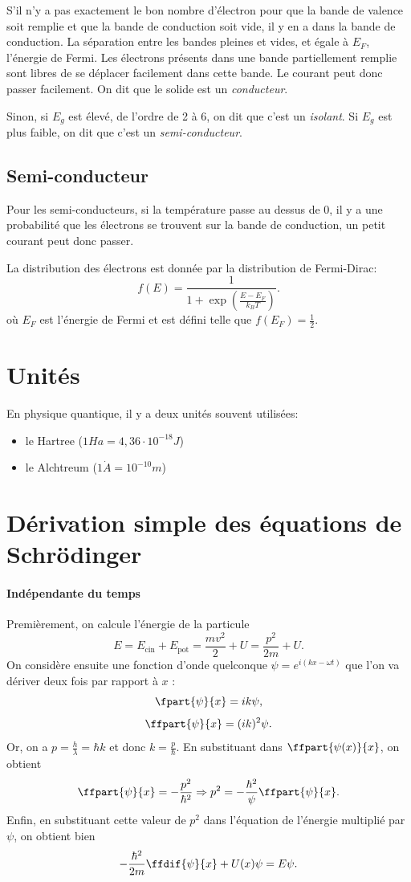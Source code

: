 S'il n'y a pas exactement le bon nombre d'électron pour
que la bande de valence soit remplie et que la bande de conduction soit
vide, il y en a dans la bande de conduction.
La séparation entre les bandes pleines et vides, et égale à $E_F$,
l'énergie de Fermi.
Les électrons présents dans une bande partiellement remplie sont libres de se
déplacer facilement dans cette bande. Le courant peut donc passer facilement.
On dit que le solide est un \emph{conducteur}.

Sinon, si $E_g$ est élevé, de l'ordre de 2 à \si{6}{\electronvolt},
on dit que c'est un \emph{isolant}.
Si $E_g$ est plus faible, on dit que c'est un \emph{semi-conducteur}.

\subsection{Semi-conducteur}
Pour les semi-conducteurs,
si la température passe au dessus de \si{0}{\kelvin},
il y a une probabilité que les électrons
se trouvent sur la bande de conduction,
un petit courant peut donc passer.

La distribution des électrons est donnée par la distribution de Fermi-Dirac:
\[ f(E) = \frac{1}{1+\exp\left(\frac{E-E_F}{k_BT}\right)}. \]
où $E_F$ est l'énergie de Fermi et est défini telle que
$f(E_F) = \frac{1}{2}$.

\appendix
\section{Unités}
En physique quantique, il y a deux unités souvent utilisées:
\begin{itemize}
\item le Hartree ($1Ha =  4,36\cdot 10^{-18} J$)
\item le Alchtreum ($1 \dot{A} = 10^{-10} m$)
\end{itemize}

\section{Dérivation simple des équations de Schrödinger}
\label{sec:deriv-eq}
\paragraph{Indépendante du temps}
Premièrement, on calcule l'énergie de la particule
\[ E = E_{\text{cin}} + E_{\text{pot}} = \frac{mv^2}{2} + U = \frac{p^2}{2m} + U.\]
On considère ensuite une fonction d'onde quelconque $\psi = e^{i(kx-\omega t)}$
que l'on va dériver deux fois par rapport à $x$ :
\[ \fpart{\psi}{x} = ik\psi ,\]
\[ \ffpart{\psi}{x} = (ik)^2\psi. \]
Or, on a $p = \frac{h}{\lambda} = \hbar k$ et donc $k = \frac{p}{\hbar}$.
En substituant dans $\ffpart{\psi(x)}{x}$, on obtient
\[ \ffpart{\psi}{x} = -\frac{p^2}{\hbar^2} \Rightarrow p^2 = 
-\frac{\hbar^2}{\psi}\ffpart{\psi}{x}.\]
Enfin, en substituant cette valeur de $p^2$ dans l'équation de l'énergie
multiplié par $\psi$, on obtient bien
\[ -\frac{\hbar^2}{2m}\ffdif{\psi}{x} + U(x)\psi = E\psi.\]

